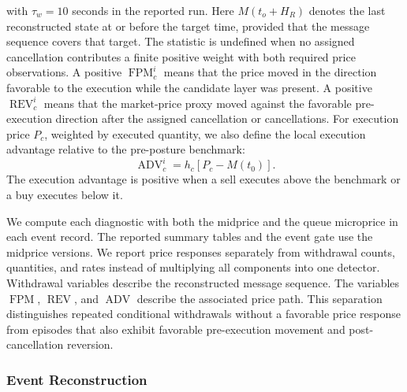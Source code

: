 \documentclass[11pt]{article}
\begin{document}
with $\tau_w=10$ seconds in the reported run. Here $M(t_o+H_R)$ denotes the last reconstructed state at or before the
target time, provided that the message sequence covers that target. The statistic is undefined when no assigned cancellation
contributes a finite positive weight with both required price observations.
A positive $\operatorname{FPM}^{i}_{c}$ means that the price moved in the direction favorable to the execution
while the candidate layer was present. A positive $\operatorname{REV}^{i}_{c}$ means that the market-price proxy moved against the favorable pre-execution direction
after the assigned cancellation or cancellations. For execution price $P_c$, weighted by executed quantity, we also define
the local execution advantage relative to the pre-posture benchmark:
\begin{equation}
    \operatorname{ADV}^{i}_{c}
    =
    h_c\left[P_c-M(t_0)\right].
    \label{eq:execution_advantage}
\end{equation}
The execution advantage is positive when a sell executes above the benchmark or a buy executes below it.

We compute each diagnostic with both the midprice and the queue microprice in each event record. The reported summary
tables and the event gate use the midprice versions. We report price responses separately from withdrawal counts,
quantities, and rates instead of multiplying all components into one detector. Withdrawal variables describe the
reconstructed message sequence. The variables $\operatorname{FPM}$, $\operatorname{REV}$, and $\operatorname{ADV}$
describe the associated price path. This separation distinguishes repeated conditional withdrawals without a favorable
price response from episodes that also exhibit favorable pre-execution movement and post-cancellation reversion.

\subsubsection{Event Reconstruction}
\label{subsec:event_reconstruction}
\end{document}
